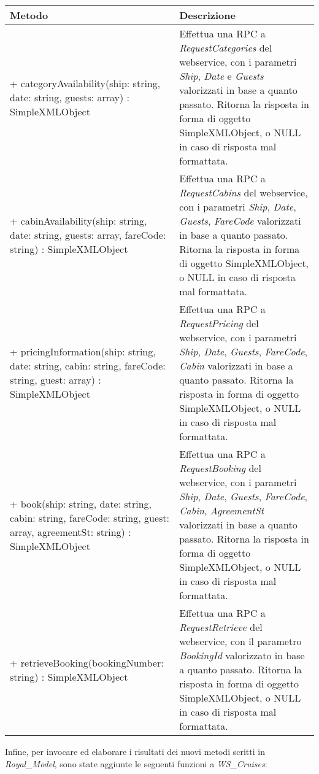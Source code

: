 \begin{center}
	\def\arraystretch{1.5}
	\begin{longtable}{ >{\raggedright}p{5.5cm} p{6.8cm}} 
		\hline
		\textbf{Metodo} & \textbf{Descrizione} \\
		\hline
		+ categoryAvailability(ship: string, date: string, guests: array) : SimpleXMLObject & Effettua una \gls{RPC} a \textit{RequestCategories} del \gls{webservice}, con i parametri \textit{Ship}, \textit{Date} e \textit{Guests} valorizzati in base a quanto passato. Ritorna la risposta in forma di oggetto SimpleXMLObject, o NULL in caso di risposta mal formattata.\\
		\hline
		+ cabinAvailability(ship: string, date: string, guests: array, fareCode: string) : SimpleXMLObject & Effettua una \gls{RPC} a \textit{RequestCabins} del \gls{webservice}, con i parametri \textit{Ship}, \textit{Date}, \textit{Guests}, \textit{FareCode} valorizzati in base a quanto passato. Ritorna la risposta in forma di oggetto SimpleXMLObject, o NULL in caso di risposta mal formattata.\\
		\hline
		+ pricingInformation(ship: string, date: string, cabin: string, fareCode: string, guest: array) : SimpleXMLObject & Effettua una \gls{RPC} a \textit{RequestPricing} del \gls{webservice}, con i parametri \textit{Ship}, \textit{Date}, \textit{Guests}, \textit{FareCode}, \textit{Cabin} valorizzati in base a quanto passato. Ritorna la risposta in forma di oggetto SimpleXMLObject, o NULL in caso di risposta mal formattata.\\
		\hline
		+ book(ship: string, date: string, cabin: string, fareCode: string, guest: array, agreementSt: string) : SimpleXMLObject & Effettua una \gls{RPC} a \textit{RequestBooking} del \gls{webservice}, con i parametri \textit{Ship}, \textit{Date}, \textit{Guests}, \textit{FareCode}, \textit{Cabin}, \textit{AgreementSt} valorizzati in base a quanto passato. Ritorna la risposta in forma di oggetto SimpleXMLObject, o NULL in caso di risposta mal formattata.\\
		\hline
		+ retrieveBooking(bookingNumber: string) : SimpleXMLObject & Effettua una \gls{RPC} a \textit{RequestRetrieve} del \gls{webservice}, con il parametro \textit{BookingId} valorizzato in base a quanto passato. Ritorna la risposta in forma di oggetto SimpleXMLObject, o NULL in caso di risposta mal formattata.\\
		\hline
	\end{longtable}
\end{center}
Infine, per invocare ed elaborare i risultati dei nuovi metodi scritti in \textit{Royal\_Model}, sono state aggiunte le seguenti funzioni a \textit{WS\_Cruises}:
